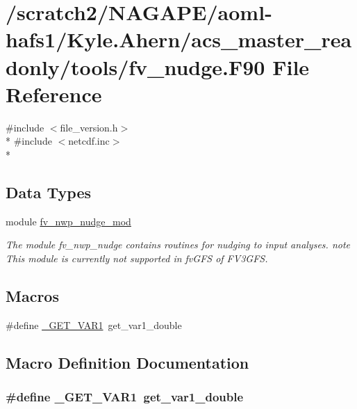 \section{/scratch2/\-N\-A\-G\-A\-P\-E/aoml-\/hafs1/\-Kyle.Ahern/acs\-\_\-master\-\_\-readonly/tools/fv\-\_\-nudge.F90 File Reference}
\label{fv__nudge_8F90}
{\ttfamily \#include $<$file\-\_\-version.\-h$>$}\\*
{\ttfamily \#include $<$netcdf.\-inc$>$}\\*
\subsection*{Data Types}
\begin{DoxyCompactItemize}
\item 
module \hyperlink{classfv__nwp__nudge__mod}{fv\-\_\-nwp\-\_\-nudge\-\_\-mod}
\begin{DoxyCompactList}\small\item\em The module fv\-\_\-nwp\-\_\-nudge contains routines for nudging to input analyses. note This module is currently not supported in fv\-G\-F\-S of F\-V3\-G\-F\-S. \end{DoxyCompactList}\end{DoxyCompactItemize}
\subsection*{Macros}
\begin{DoxyCompactItemize}
\item 
\#define \hyperlink{fv__nudge_8F90_aa573d7adaa945bb61ee4d9ca00756c63}{\-\_\-\-G\-E\-T\-\_\-\-V\-A\-R1}~get\-\_\-var1\-\_\-double
\end{DoxyCompactItemize}


\subsection{Macro Definition Documentation}
\subsubsection[{\-\_\-\-G\-E\-T\-\_\-\-V\-A\-R1}]{\setlength{\rightskip}{0pt plus 5cm}\#define \-\_\-\-G\-E\-T\-\_\-\-V\-A\-R1~get\-\_\-var1\-\_\-double}\label{fv__nudge_8F90_aa573d7adaa945bb61ee4d9ca00756c63}
